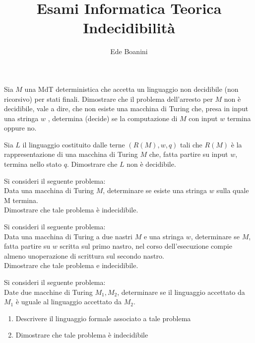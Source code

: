 \documentclass{article}  %
\title{Esami Informatica Teorica \\ Indecidibilità}
\author{Ede Boanini}
\date{}  %
\begin{document}
\maketitle
\begin{esercizio}[Esercizio 1]
 Sia  $M$  una MdT deterministica che accetta un linguaggio non decidibile (non ricorsivo) per stati finali. 
 Dimostrare che il problema dell'arresto per  $M$
 non è decidibile, vale a dire, che non esiste una macchina di Turing che, presa in
 input una stringa  $w$ , determina (decide) se la computazione di  $M$  con input  $w$
 termina oppure no.
\end{esercizio}

\begin{esercizio}[Esercizio 2]
 Sia  $L$  il linguaggio costituito dalle terne  $(R(M),w, q)$ tali che  $R(M)$  è la
 rappresentazione di una macchina di Turing  $M$  che, fatta partire su input  $w$, termina
 nello stato  $q$. Dimostrare che  $L$  non è decidibile.
\end{esercizio}

\begin{esercizio}[Esercizio 3]
 Si consideri il seguente problema: \\
 Data una macchina di Turing  $M$, determinare se esiste una stringa  $w$
 sulla quale  M  termina. \\
 Dimostrare che tale problema è indecidibile.
\end{esercizio}

\begin{esercizio}[Esercizio 4]
Si consideri il seguente problema: \\
 Data una macchina di Turing a due nastri $M$ e una stringa $w$, determinare
 se $M$, fatta partire su $w$ scritta sul primo nastro, nel corso dell'esecuzione
 compie almeno unoperazione di scrittura sul secondo nastro. \\
 Dimostrare che tale problema e indecidibile.
\end{esercizio}

\begin{esercizio}[Esercizio 5]
Si consideri il seguente problema: \\
Date due macchine di Turing $M_1, M_2$, determinare se il linguaggio accettato da $M_1$ è uguale al linguaggio accettato da $M_2$. \\
\begin{enumerate}
    \item Descrivere il linguaggio formale associato a tale problema
    \item Dimostrare che tale problema è indecidibile
\end{enumerate}
\end{esercizio}
\end{document}
